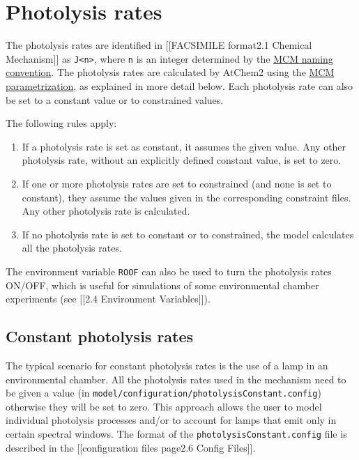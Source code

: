 \section{Photolysis rates} \label{sec:photolysis}

The photolysis rates are identified in {[}{[}FACSIMILE
format\textbar{}2.1 Chemical Mechanism{]}{]} as
\texttt{J\textless{}n\textgreater{}}, where \texttt{n} is an integer
determined by the
\href{http://mcm.leeds.ac.uk/MCMv3.3.1/parameters/photolysis.htt}{MCM
naming convention}. The photolysis rates are calculated by AtChem2 using
the
\href{http://mcm.leeds.ac.uk/MCM/parameters/photolysis_param.htt}{MCM
parametrization}, as explained in more detail below. Each photolysis
rate can also be set to a constant value or to constrained values.

The following rules apply:

\begin{enumerate}
\def\labelenumi{\arabic{enumi}.}
\item
  If a photolysis rate is set as constant, it assumes the given value.
  Any other photolysis rate, without an explicitly defined constant
  value, is set to zero.
\item
  If one or more photolysis rates are set to constrained (and none is
  set to constant), they assume the values given in the corresponding
  constraint files. Any other photolysis rate is calculated.
\item
  If no photolysis rate is set to constant or to constrained, the model
  calculates all the photolysis rates.
\end{enumerate}

The environment variable \texttt{ROOF} can also be used to turn the
photolysis rates ON/OFF, which is useful for simulations of some
environmental chamber experiments (see {[}{[}2.4 Environment
Variables{]}{]}).

\hypertarget{constant-photolysis-rates}{%
\subsection{Constant photolysis rates}\label{constant-photolysis-rates}}

The typical scenario for constant photolysis rates is the use of a lamp
in an environmental chamber. All the photolysis rates used in the
mechanism need to be given a value (in
\texttt{model/configuration/photolysisConstant.config}) otherwise they
will be set to zero. This approach allows the user to model individual
photolysis processes and/or to account for lamps that emit only in
certain spectral windows. The format of the
\texttt{photolysisConstant.config} file is described in the
{[}{[}configuration files page\textbar{}2.6 Config Files{]}{]}.


